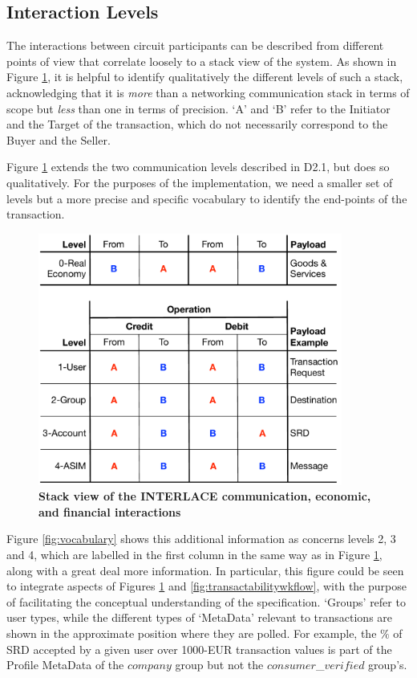 \subsection{Interaction Levels}
The interactions between circuit participants can be described from different points of view that correlate loosely to a stack view of the system. As shown in Figure \ref{fig:stack}, it is helpful to identify qualitatively the different levels of such a stack, acknowledging that it is \emph{more} than a networking communication stack in terms of scope but \emph{less} than one in terms of precision. `A' and `B' refer to the Initiator and the Target of the transaction, which do not necessarily correspond to the Buyer and the Seller.

Figure \ref{fig:stack} extends the two communication levels described in D2.1, but does so qualitatively. For the purposes of the implementation, we need a smaller set of levels but a more precise and specific vocabulary to identify the end-points of the transaction.

\begin{figure}[H]
\centering
\includegraphics[width=10cm]{Figures/Stack}
\caption{\small\textbf{Stack view of the INTERLACE communication, economic, and financial  interactions}}
\label{fig:stack}
\vspace{-0.5cm}
\end{figure}

Figure \ref{fig:vocabulary} shows this additional information as concerns levels 2, 3 and 4, which are labelled in the first column in the same way as in Figure \ref{fig:stack}, along with a great deal more information. In particular, this figure could be seen to integrate aspects of Figures \ref{fig:stack} and \ref{fig:transactabilitywkflow}, with the purpose of facilitating the conceptual understanding of the specification. `Groups' refer to user types, while the different types of `MetaData' relevant to transactions are shown in the approximate position where they are polled. For example, the $\%$ of SRD accepted by a given user over 1000-EUR transaction values is part of the Profile MetaData of the $company$ group but not the $consumer$\_$verified$ group's.

